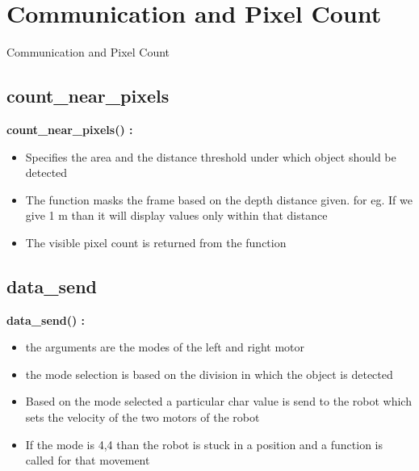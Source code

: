 \documentclass[10pt, a4paper]{beamer}
\begin{document}
\section{Communication and Pixel Count}
\begin{frame}[allowframebreaks]{Communication and Pixel Count}
  \subsection{count\_near\_pixels}
    \textbf{count\_near\_pixels() : }
      \begin{itemize}
       \item Specifies the area and the distance threshold under which object should be detected
       \item The function masks the frame based on the depth distance given. for eg. If we give 1 m than it will display values only within that distance
       \item The visible pixel count is returned from the function
      \end{itemize}
\framebreak
  \subsection{data\_send}
    \textbf{data\_send() : }
      \begin{itemize}
       \item the arguments are the modes of the left and right motor
       \item the mode selection is based on the division in which the object is detected
       \item Based on the mode selected a particular char value is send to the robot which sets the velocity of the two motors of the robot
       \item If the mode is 4,4 than the robot is stuck in a position and a function is called for that movement
      \end{itemize}
\end{frame}
\end{document}
